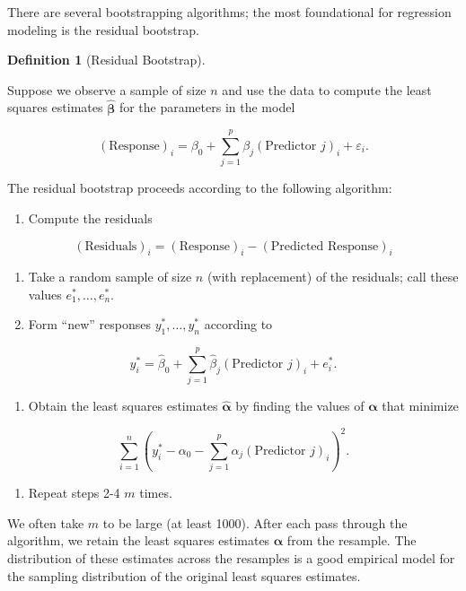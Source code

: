 \documentclass[
  letterpaper,
  DIV=11,
  numbers=noendperiod]{scrreprt}
\providecommand{\tightlist}{%
  \setlength{\itemsep}{0pt}\setlength{\parskip}{0pt}}\usepackage{longtable,booktabs,array}
\theoremstyle{definition}
\theoremstyle{definition}
\newtheorem{definition}{Definition}[chapter]
\theoremstyle{remark}
\begin{document}
There are several bootstrapping algorithms; the most foundational for
regression modeling is the residual bootstrap.

\begin{definition}[Residual
Bootstrap]\protect\hypertarget{def-residual-bootstrap}{}\label{def-residual-bootstrap}

Suppose we observe a sample of size \(n\) and use the data to compute
the least squares estimates \(\widehat{\boldsymbol{\beta}}\) for the
parameters in the model

\[(\text{Response})_i = \beta_0 + \sum_{j=1}^{p} \beta_j (\text{Predictor } j)_i + \varepsilon_i.\]

The residual bootstrap proceeds according to the following algorithm:

\begin{enumerate}
\def\labelenumi{\arabic{enumi}.}
\tightlist
\item
  Compute the residuals
\end{enumerate}

\[(\text{Residuals})_i = (\text{Response})_i - (\text{Predicted Response})_i\]

\begin{enumerate}
\def\labelenumi{\arabic{enumi}.}
\setcounter{enumi}{1}
\tightlist
\item
  Take a random sample of size \(n\) (with replacement) of the
  residuals; call these values \(e_1^*, \dotsc, e_n^*\).
\item
  Form ``new'' responses \(y_1^*, \dotsc, y_n^*\) according to
\end{enumerate}

\[y_i^* = \widehat{\beta}_0 + \sum_{j=1}^{p} \widehat{\beta}_j (\text{Predictor } j)_i + e_i^*.\]

\begin{enumerate}
\def\labelenumi{\arabic{enumi}.}
\setcounter{enumi}{3}
\tightlist
\item
  Obtain the least squares estimates \(\widehat{\boldsymbol{\alpha}}\)
  by finding the values of \(\boldsymbol{\alpha}\) that minimize
\end{enumerate}

\[\sum_{i=1}^{n} \left(y_i^* - \alpha_0 - \sum_{j=1}^{p} \alpha_j (\text{Predictor } j)_i\right)^2.\]

\begin{enumerate}
\def\labelenumi{\arabic{enumi}.}
\setcounter{enumi}{4}
\tightlist
\item
  Repeat steps 2-4 \(m\) times.
\end{enumerate}

We often take \(m\) to be large (at least 1000). After each pass through
the algorithm, we retain the least squares estimates
\(\widehat{\boldsymbol{\alpha}}\) from the resample. The distribution of
these estimates across the resamples is a good empirical model for the
sampling distribution of the original least squares estimates.

\end{definition}
\end{document}
